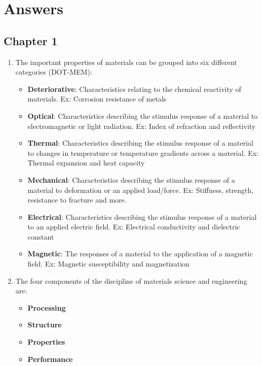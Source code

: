\documentclass{article}
\begin{document}
\section{Answers}

\subsection{Chapter 1}

\begin{enumerate}
    \item The important properties of materials can be grouped into six different categories (DOT-MEM): \begin{itemize}
    \item \textbf{Deteriorative}: Characteristics relating to the chemical reactivity of materials. Ex: Corrosion resistance of metals
    \item \textbf{Optical}: Characteristics describing the stimulus response of a material to electromagnetic or light radiation. Ex: Index of refraction and reflectivity
    \item \textbf{Thermal}: Characteristics describing the stimulus response of a material to changes in temperature or temperature gradients across a material. Ex: Thermal expansion and heat capacity
    \item \textbf{Mechanical}: Characteristics describing the stimulus response of a material to deformation or an applied load/force. Ex: Stiffness, strength, resistance to fracture and more.
    \item \textbf{Electrical}: Characteristics describing the stimulus response of a material to an applied electric field. Ex: Electrical conductivity and dielectric constant
    \item \textbf{Magnetic}: The responses of a material to the application of a magnetic field. Ex: Magnetic susceptibility and magnetization
\end{itemize}

\item The four components of the discipline of materials science and engineering are: \begin{itemize}
    \item \textbf{Processing}
    \item \textbf{Structure}
    \item \textbf{Properties}
    \item \textbf{Performance}
\end{itemize}


\end{enumerate}
\end{document}
